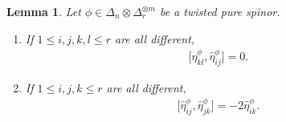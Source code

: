 \documentclass[10pt,a4paper]{amsart}
\numberwithin{equation}{section}
\newtheorem{Lemma}[Theorem]{Lemma}
\begin{document}
\begin{Lemma}\label{commutators} Let $\phi\in\Delta_n\otimes\Delta_r^{\otimes m}$ be a twisted pure spinor.
\begin{enumerate}\itemsep=0pt
 \item[$1.$] If $1\leq i,j,k,l\leq r$ are all different,
 \begin{gather}
 \big[\hat\eta_{kl}^\phi,\hat\eta_{ij}^\phi\big]=0.\label{[kl,ij]=0}
 \end{gather}
\item[$2.$] If $1\leq i,j,k\leq r$ are all different,
 \begin{gather}
 \big[\hat\eta_{ij}^\phi,\hat\eta_{jk}^\phi\big]=-2 \hat\eta_{ik}^\phi.\label{[ij,jk]=-ik}
 \end{gather}
\end{enumerate}
\end{Lemma}
\end{document}
